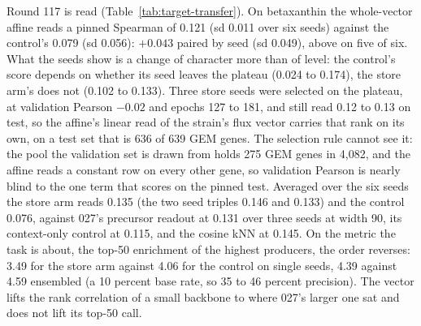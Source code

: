 Round 117 is read (Table~\ref{tab:target-transfer}). On betaxanthin the whole-vector
affine reads a pinned Spearman of 0.121 (sd 0.011 over six seeds) against the control's
0.079 (sd 0.056): $+0.043$ paired by seed (sd 0.049), above on five of six. What the
seeds show is a change of character more than of level: the control's score depends on
whether its seed leaves the plateau (0.024 to 0.174), the store arm's does not (0.102 to
0.133). Three store seeds were selected on the plateau, at validation Pearson $-0.02$
and epochs 127 to 181, and still read 0.12 to 0.13 on test, so the affine's linear read
of the strain's flux vector carries that rank on its own, on a test set that is 636 of
639 GEM genes. The selection rule cannot see it: the pool the validation set is drawn
from holds 275 GEM genes in 4,082, and the affine reads a constant row on every other
gene, so validation Pearson is nearly blind to the one term that scores on the pinned
test. Averaged over the six seeds the store arm reads 0.135 (the two seed triples 0.146
and 0.133) and the control 0.076, against 027's precursor readout at 0.131 over three
seeds at width 90, its context-only control at 0.115, and the cosine kNN at 0.145. On
the metric the task is about, the top-50 enrichment of the highest producers, the order
reverses: 3.49 for the store arm against 4.06 for the control on single seeds, 4.39
against 4.59 ensembled (a 10 percent base rate, so 35 to 46 percent precision). The
vector lifts the rank correlation of a small backbone to where 027's larger one sat and
does not lift its top-50 call.

